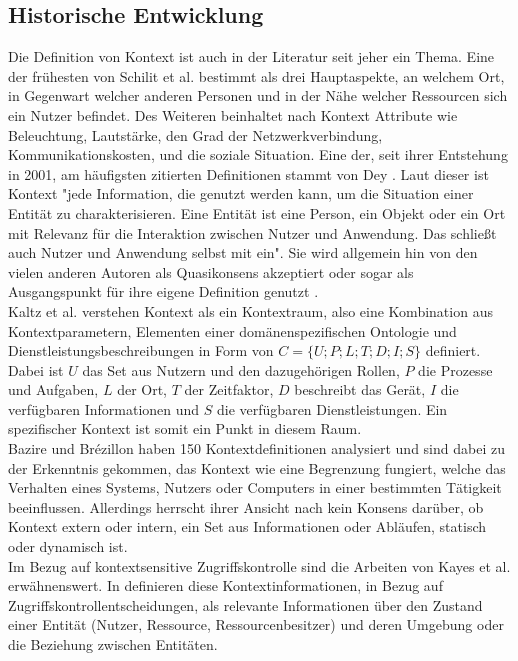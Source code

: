 \subsection{Historische Entwicklung}
Die Definition von Kontext ist auch in der Literatur seit jeher ein Thema. Eine der frühesten von Schilit et al. \cite{schilit_context-aware_1994} bestimmt als drei Hauptaspekte, an welchem Ort, in Gegenwart welcher anderen Personen und in der Nähe welcher Ressourcen sich ein Nutzer befindet. Des Weiteren beinhaltet nach \cite{schilit_context-aware_1994} Kontext Attribute wie Beleuchtung, Lautstärke, den Grad der Netzwerkverbindung, Kommunikationskosten, und die soziale Situation. Eine der, seit ihrer Entstehung in 2001, am häufigsten zitierten Definitionen stammt von Dey \cite{dey_understanding_2001}. Laut dieser ist Kontext "jede Information, die genutzt werden kann, um die Situation einer Entität zu charakterisieren. Eine Entität ist eine Person, ein Objekt oder ein Ort mit Relevanz für die Interaktion zwischen Nutzer und Anwendung. Das schließt auch Nutzer und Anwendung selbst mit ein". Sie wird allgemein hin von den vielen anderen Autoren als Quasikonsens akzeptiert \cite{aguilar_cameonto_2018,alegre_engineering_2016,wei_liu_survey_2011} oder sogar als Ausgangspunkt für ihre eigene Definition genutzt \cite{kayes_icaf_2012, kokinov_operational_2007}.\\
Kaltz et al. \cite{wolfgang_kaltz_context-aware_2005} verstehen Kontext als ein Kontextraum, also eine Kombination aus Kontextparametern, Elementen einer domänenspezifischen Ontologie und Dienstleistungsbeschreibungen in Form von $C = \{U;P;L;T;D;I;S\}$ definiert.
Dabei ist $U$ das Set aus Nutzern und den dazugehörigen Rollen, $P$ die Prozesse und Aufgaben,  $L$ der Ort,  $T$ der Zeitfaktor,  $D$ beschreibt das Gerät, $I$ die verfügbaren Informationen und $S$ die verfügbaren Dienstleistungen. Ein spezifischer Kontext ist somit ein Punkt in diesem Raum.\\
Bazire und Brézillon \cite{hutchison_understanding_2005} haben 150 Kontextdefinitionen analysiert und sind dabei zu der Erkenntnis gekommen, das Kontext wie eine Begrenzung fungiert, welche das Verhalten eines Systems, Nutzers oder Computers in einer bestimmten Tätigkeit beeinflussen.
Allerdings herrscht ihrer Ansicht nach kein Konsens darüber, ob Kontext extern oder intern, ein Set aus Informationen oder Abläufen, statisch oder dynamisch ist.\\ 
Im Bezug auf kontextsensitive Zugriffskontrolle sind die Arbeiten von Kayes et al. \cite{kayes_icaf_2012,kayes_survey_2020,kayes_ontological_2015} erwähnenswert. In \cite{kayes_icaf_2012} definieren diese Kontextinformationen, in Bezug auf Zugriffskontrollentscheidungen, als relevante Informationen über den Zustand einer Entität (Nutzer, Ressource, Ressourcenbesitzer) und deren Umgebung oder die Beziehung zwischen Entitäten.
